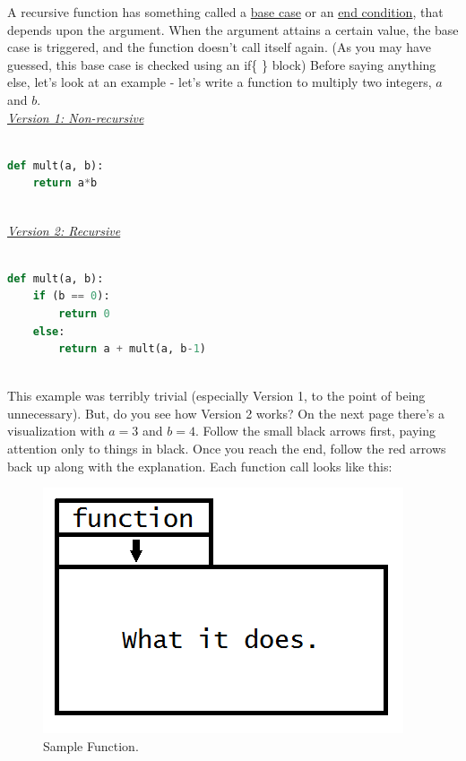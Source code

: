 \documentclass{article}
\begin{document}
\noindent A recursive function has something called a \underline{base case} or an \underline{end condition}, that depends upon the argument. When the argument attains a certain value, the base case is triggered, and the function doesn't call itself again. (As you may have guessed, this base case is checked using an if\{ \} block) Before saying anything else, let's look at an example - let's write a function to multiply two integers, $a$ and $b$. \\

\noindent \underline{\textit{Version 1: Non-recursive}} 
\begin{lstlisting}[language=Python]

def mult(a, b):     
    return a*b 
    
\end{lstlisting} 
\vspace{5mm}

\noindent \underline{\textit{Version 2: Recursive}} 
\begin{lstlisting}[language=Python]

def mult(a, b):
    if (b == 0):
        return 0
    else:
        return a + mult(a, b-1)
        
\end{lstlisting}
\vspace{5mm}

\noindent This example was terribly trivial (especially Version 1, to the point of being unnecessary). But, do you see how Version 2 works? On the next page there's a visualization with $a = 3$ and $b = 4$. Follow the small black arrows first, paying attention only to things in black. Once you reach the end, follow the red arrows back up along with the explanation. Each function call looks like this: 

\FloatBarrier
\begin{figure}
    \centering
    \includegraphics[scale=0.5]{SampleFunction}
    \caption{Sample Function.}
    \label{SampleFunction}
\end{figure}
\newpage 
\end{document}
